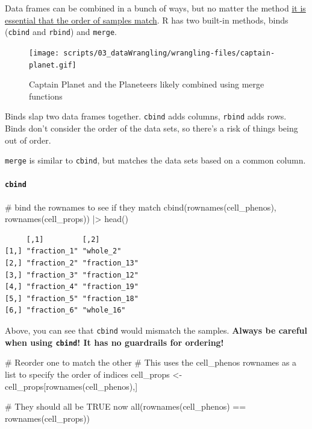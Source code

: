 \documentclass[
  letterpaper,
  DIV=11,
  numbers=noendperiod]{scrreprt}
\let\oldparagraph\paragraph
\renewcommand{\paragraph}[1]{\oldparagraph{#1}\mbox{}}
\newenvironment{Shaded}{\begin{snugshade}}{\end{snugshade}}
\newcommand{\CommentTok}[1]{\textcolor[rgb]{0.37,0.37,0.37}{#1}}
\newcommand{\FunctionTok}[1]{\textcolor[rgb]{0.28,0.35,0.67}{#1}}
\newcommand{\NormalTok}[1]{\textcolor[rgb]{0.00,0.23,0.31}{#1}}
\newcommand{\OtherTok}[1]{\textcolor[rgb]{0.00,0.23,0.31}{#1}}
\newcommand{\SpecialCharTok}[1]{\textcolor[rgb]{0.37,0.37,0.37}{#1}}
\begin{document}
Data frames can be combined in a bunch of ways, but no matter the method
\ul{it is essential that the order of samples match}. R has two built-in
methods, binds (\texttt{cbind} and \texttt{rbind}) and \texttt{merge}.

\begin{figure}[H]

{\centering \texttt{[image: scripts/03\_dataWrangling/wrangling-files/captain-planet.gif]}

}

\caption{Captain Planet and the Planeteers likely combined using merge
functions}

\end{figure}%

Binds slap two data frames together. \texttt{cbind} adds columns,
\texttt{rbind} adds rows. Binds don't consider the order of the data
sets, so there's a risk of things being out of order.

\texttt{merge} is similar to \texttt{cbind}, but matches the data sets
based on a common column.

\paragraph{\texorpdfstring{\texttt{cbind}}{cbind}}\label{cbind}

\begin{Shaded}
\begin{Highlighting}[]
\CommentTok{\# bind the rownames to see if they match}
\FunctionTok{cbind}\NormalTok{(}\FunctionTok{rownames}\NormalTok{(cell\_phenos), }\FunctionTok{rownames}\NormalTok{(cell\_props)) }\SpecialCharTok{|\textgreater{}} \FunctionTok{head}\NormalTok{()}
\end{Highlighting}
\end{Shaded}

\begin{verbatim}
     [,1]         [,2]         
[1,] "fraction_1" "whole_2"    
[2,] "fraction_2" "fraction_13"
[3,] "fraction_3" "fraction_12"
[4,] "fraction_4" "fraction_19"
[5,] "fraction_5" "fraction_18"
[6,] "fraction_6" "whole_16"   
\end{verbatim}

Above, you can see that \texttt{cbind} would mismatch the samples.
\textbf{Always be careful when using \texttt{cbind}! It has no
guardrails for ordering!}

\begin{Shaded}
\begin{Highlighting}[]
\CommentTok{\# Reorder one to match the other}
\CommentTok{\# This uses the cell\_phenos rownames as a list to specify the order of indices }
\NormalTok{cell\_props }\OtherTok{\textless{}{-}}\NormalTok{ cell\_props[}\FunctionTok{rownames}\NormalTok{(cell\_phenos),]}

\CommentTok{\# They should all be TRUE now}
\FunctionTok{all}\NormalTok{(}\FunctionTok{rownames}\NormalTok{(cell\_phenos) }\SpecialCharTok{==} \FunctionTok{rownames}\NormalTok{(cell\_props))}
\end{Highlighting}
\end{Shaded}
\end{document}
